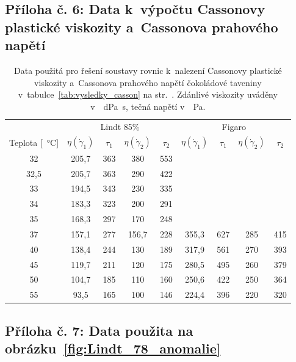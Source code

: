 \documentclass[12pt]{article}
\begin{document}
\newpage%
\subsection*{Příloha č. 6: Data k~výpočtu Cassonovy plastické viskozity a~Cassonova prahového napětí}

\begin{table}[h!]
    \centering
    \begin{tabular}{|c|c c c c|c c c c|}
        \hline
        & \multicolumn{4}{c|}{Lindt 85\%} & \multicolumn{4}{c|}{Figaro}\\
        Teplota [\SI{}{\degreeCelsius}] & $\eta(\dot\gamma_1)$ & $\tau_1$ & $\eta(\dot\gamma_2)$ & $\tau_2$ & $\eta(\dot\gamma_1)$ & $\tau_1$ & $\eta(\dot\gamma_2)$ & $\tau_2$ \\\hline
        32 & 205,7 & 363 & 380 & 553 & & & &\\
        32,5 & 205,7 & 363 & 290 & 422 & & & &\\
        33 & 194,5 & 343 & 230 & 335 & & & &\\
        34 & 183,3 & 323 & 200 & 291 & & & &\\
        35 & 168,3 & 297 & 170 & 248 & & & &\\
        37 & 157,1 & 277 & 156,7 & 228 & 355,3 & 627 & 285 & 415\\
        40 & 138,4 & 244 & 130 & 189 & 317,9 & 561 & 270 & 393\\
        45 & 119,7 & 211 & 120 & 175 & 280,5 & 495 & 260 & 379\\
        50 & 104,7 & 185 & 110 & 160 & 250,6 & 422 & 250 & 364\\
        55 & 93,5 & 165 & 100 & 146 & 224,4 & 396 & 220 & 320\\\hline 
    \end{tabular}
    \caption{Data použitá pro řešení soustavy rovnic k~nalezení Cassonovy plastické viskozity a~Cassonova prahového napětí čokoládové taveniny v~tabulce~\ref{tab:vysledky_casson} na str.~\pageref{tab:vysledky_casson}. Zdánlivé viskozity uváděny v~\SI{}{\deci\pascal\second}, tečná napětí v~\SI{}{\pascal}.}
    \label{tab:vypocet_casson}
\end{table}

\subsection*{Příloha č. 7: Data použita na obrázku~\ref{fig:Lindt_78_anomalie}}
\end{document}
